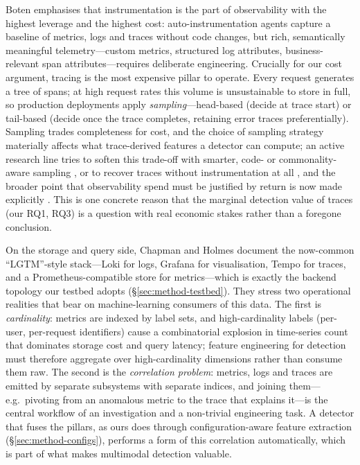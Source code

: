 \documentclass[acmsmall]{acmart}
\begin{document}
Boten \cite{boten2022} emphasises that instrumentation is the part of observability with the highest leverage and the highest cost: auto-instrumentation agents capture a baseline of metrics, logs and traces without code changes, but rich, semantically meaningful telemetry---custom metrics, structured log attributes, business-relevant span attributes---requires deliberate engineering. Crucially for our cost argument, tracing is the most expensive pillar to operate. Every request generates a tree of spans; at high request rates this volume is unsustainable to store in full, so production deployments apply \emph{sampling}---head-based (decide at trace start) or tail-based (decide once the trace completes, retaining error traces preferentially). Sampling trades completeness for cost, and the choice of sampling strategy materially affects what trace-derived features a detector can compute; an active research line tries to soften this trade-off with smarter, code- or commonality-aware sampling \cite{huang2025mint,wu2025tracesampling}, or to recover traces without instrumentation at all \cite{ashok2024traceweaver}, and the broader point that observability spend must be justified by return is now made explicitly \cite{hausenblas2023roi}. This is one concrete reason that the marginal detection value of traces (our RQ1, RQ3) is a question with real economic stakes rather than a foregone conclusion.

On the storage and query side, Chapman and Holmes \cite{chapman2023} document the now-common ``LGTM''-style stack---Loki for logs, Grafana for visualisation, Tempo for traces, and a Prometheus-compatible store for metrics---which is exactly the backend topology our testbed adopts (\S\ref{sec:method-testbed}). They stress two operational realities that bear on machine-learning consumers of this data. The first is \emph{cardinality}: metrics are indexed by label sets, and high-cardinality labels (per-user, per-request identifiers) cause a combinatorial explosion in time-series count that dominates storage cost and query latency; feature engineering for detection must therefore aggregate over high-cardinality dimensions rather than consume them raw. The second is the \emph{correlation problem}: metrics, logs and traces are emitted by separate subsystems with separate indices, and joining them---e.g.\ pivoting from an anomalous metric to the trace that explains it---is the central workflow of an investigation and a non-trivial engineering task. A detector that fuses the pillars, as ours does through configuration-aware feature extraction (\S\ref{sec:method-configs}), performs a form of this correlation automatically, which is part of what makes multimodal detection valuable.
\end{document}
